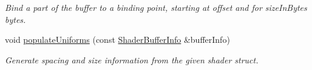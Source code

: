 \begin{Indent}
\begin{DoxyCompactItemize}
\begin{DoxyCompactList}\small\item\em Bind a part of the buffer to a binding point, starting at offset and for size\+In\+Bytes bytes. \end{DoxyCompactList}\item 
\mbox{\label{classrev_1_1_u_b_o_a9faca2e4f838b7e5b3f2c3cfdc9fde13}} 
void \mbox{\hyperlink{classrev_1_1_u_b_o_a9faca2e4f838b7e5b3f2c3cfdc9fde13}{populate\+Uniforms}} (const \mbox{\hyperlink{structrev_1_1_shader_buffer_info}{Shader\+Buffer\+Info}} \&buffer\+Info)
\begin{DoxyCompactList}\small\item\em Generate spacing and size information from the given shader struct. \end{DoxyCompactList}\end{DoxyCompactItemize}
\end{Indent}

